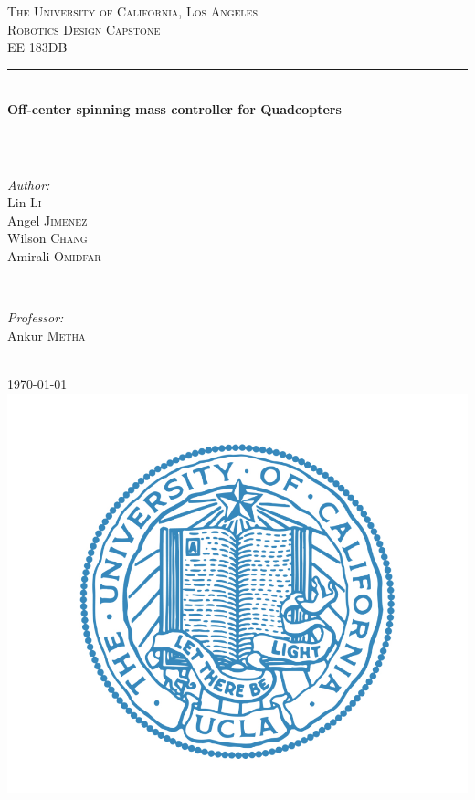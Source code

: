 \begin{titlepage}
\newcommand{\HRule}{\rule{\linewidth}{0.5mm}} %
\center %
\textsc{\LARGE The University of California, Los Angeles}\\[1.5cm] %
\textsc{\Large Robotics Design Capstone}\\[0.5cm] %
\textsc{\large EE 183DB }\\[0.5cm] %
\HRule \\[0.4cm]
{ \huge \bfseries Off-center spinning mass controller for Quadcopters}\\[0.4cm] %
\HRule \\[1.5cm]
\begin{minipage}{0.4\textwidth}
\begin{flushleft} \large
\emph{Author:}\\
Lin \textsc{Li} %
\\
Angel \textsc{Jimenez} %
\\
Wilson \textsc{Chang} %
\\
Amirali \textsc{Omidfar} %
\end{flushleft}
\end{minipage}
~
\begin{minipage}{0.4\textwidth}
\begin{flushright} \large
\emph{Professor:} \\
Ankur \textsc{Metha} %
\end{flushright}
\end{minipage}\\[1cm]
{\large \today}\\[1cm] %
\includegraphics[scale=0.2]{UCLA_Logo.png}\\[1cm] %
\vfill %
\end{titlepage}
